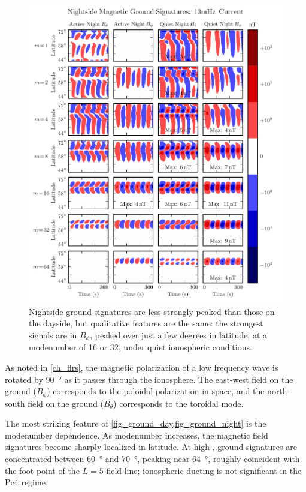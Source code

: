 \begin{figure}[!htb]
  \centering
  \includegraphics[width=\textwidth]{figures/ground_night.pdf}
  \caption[Nightside Ground Magnetic Fields]{
    Nightside ground signatures are less strongly peaked than those on the
    dayside, but qualitative features are the same: the strongest signals are
    in $B_\phi$, peaked over just a few degrees in latitude, at a modenumber of
    16 or 32, under quiet ionospheric conditions. 
  }
  \label{fig_ground_night}
\end{figure}

As noted in \cref{ch_flrs}, the magnetic polarization of a low frequency
\Alfven wave is rotated by \about\SI{90}{\degree} as it passes through the
ionosphere. The east-west field on the ground ($B_\phi$) corresponds to the
poloidal polarization in space, and the north-south field on the ground
($B_\theta$) corresponds to the toroidal mode. 

The most striking feature of \cref{fig_ground_day,fig_ground_night} is the
modenumber dependence. As modenumber increases, the magnetic field signatures
become sharply localized in latitude. At high \azm, ground signatures are
concentrated between \SI{60}{\degree} and \SI{70}{\degree}, peaking near
\SI{64}{\degree}, roughly coincident with the foot point of the $L = 5$ field
line; ionospheric ducting is not significant in the Pc4 regime. 

